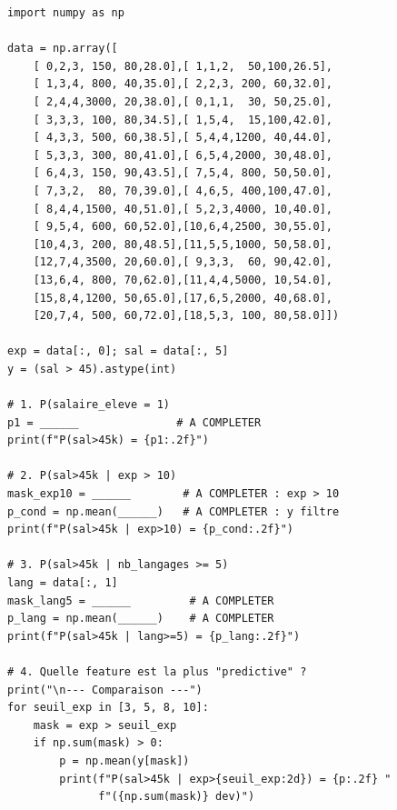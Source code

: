 \begin{pythonbox}
\begin{lstlisting}
import numpy as np

data = np.array([
    [ 0,2,3, 150, 80,28.0],[ 1,1,2,  50,100,26.5],
    [ 1,3,4, 800, 40,35.0],[ 2,2,3, 200, 60,32.0],
    [ 2,4,4,3000, 20,38.0],[ 0,1,1,  30, 50,25.0],
    [ 3,3,3, 100, 80,34.5],[ 1,5,4,  15,100,42.0],
    [ 4,3,3, 500, 60,38.5],[ 5,4,4,1200, 40,44.0],
    [ 5,3,3, 300, 80,41.0],[ 6,5,4,2000, 30,48.0],
    [ 6,4,3, 150, 90,43.5],[ 7,5,4, 800, 50,50.0],
    [ 7,3,2,  80, 70,39.0],[ 4,6,5, 400,100,47.0],
    [ 8,4,4,1500, 40,51.0],[ 5,2,3,4000, 10,40.0],
    [ 9,5,4, 600, 60,52.0],[10,6,4,2500, 30,55.0],
    [10,4,3, 200, 80,48.5],[11,5,5,1000, 50,58.0],
    [12,7,4,3500, 20,60.0],[ 9,3,3,  60, 90,42.0],
    [13,6,4, 800, 70,62.0],[11,4,4,5000, 10,54.0],
    [15,8,4,1200, 50,65.0],[17,6,5,2000, 40,68.0],
    [20,7,4, 500, 60,72.0],[18,5,3, 100, 80,58.0]])

exp = data[:, 0]; sal = data[:, 5]
y = (sal > 45).astype(int)

# 1. P(salaire_eleve = 1)
p1 = ______               # A COMPLETER
print(f"P(sal>45k) = {p1:.2f}")

# 2. P(sal>45k | exp > 10)
mask_exp10 = ______        # A COMPLETER : exp > 10
p_cond = np.mean(______)   # A COMPLETER : y filtre
print(f"P(sal>45k | exp>10) = {p_cond:.2f}")

# 3. P(sal>45k | nb_langages >= 5)
lang = data[:, 1]
mask_lang5 = ______         # A COMPLETER
p_lang = np.mean(______)    # A COMPLETER
print(f"P(sal>45k | lang>=5) = {p_lang:.2f}")

# 4. Quelle feature est la plus "predictive" ?
print("\n--- Comparaison ---")
for seuil_exp in [3, 5, 8, 10]:
    mask = exp > seuil_exp
    if np.sum(mask) > 0:
        p = np.mean(y[mask])
        print(f"P(sal>45k | exp>{seuil_exp:2d}) = {p:.2f} "
              f"({np.sum(mask)} dev)")
\end{lstlisting}
\end{pythonbox}


